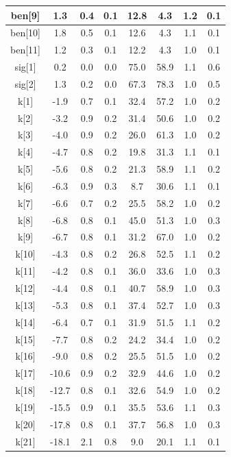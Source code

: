 \begin{longtable}{|c|c|c|c|c|c|c|c|}
\hline
ben[9] & 1.3 & 0.4 & 0.1 & 12.8 & 4.3 & 1.2 & 0.1 \\
\hline
ben[10] & 1.8 & 0.5 & 0.1 & 12.6 & 4.3 & 1.1 & 0.1 \\
\hline
ben[11] & 1.2 & 0.3 & 0.1 & 12.2 & 4.3 & 1.0 & 0.1 \\
\hline
sig[1] & 0.2 & 0.0 & 0.0 & 75.0 & 58.9 & 1.1 & 0.6 \\
\hline
sig[2] & 1.3 & 0.2 & 0.0 & 67.3 & 78.3 & 1.0 & 0.5 \\
\hline
k[1] & -1.9 & 0.7 & 0.1 & 32.4 & 57.2 & 1.0 & 0.2 \\
\hline
k[2] & -3.2 & 0.9 & 0.2 & 31.4 & 50.6 & 1.0 & 0.2 \\
\hline
k[3] & -4.0 & 0.9 & 0.2 & 26.0 & 61.3 & 1.0 & 0.2 \\
\hline
k[4] & -4.7 & 0.8 & 0.2 & 19.8 & 31.3 & 1.1 & 0.1 \\
\hline
k[5] & -5.6 & 0.8 & 0.2 & 21.3 & 58.9 & 1.1 & 0.2 \\
\hline
k[6] & -6.3 & 0.9 & 0.3 & 8.7 & 30.6 & 1.1 & 0.1 \\
\hline
k[7] & -6.6 & 0.7 & 0.2 & 25.5 & 58.2 & 1.0 & 0.2 \\
\hline
k[8] & -6.8 & 0.8 & 0.1 & 45.0 & 51.3 & 1.0 & 0.3 \\
\hline
k[9] & -6.7 & 0.8 & 0.1 & 31.2 & 67.0 & 1.0 & 0.2 \\
\hline
k[10] & -4.3 & 0.8 & 0.2 & 26.8 & 52.5 & 1.1 & 0.2 \\
\hline
k[11] & -4.2 & 0.8 & 0.1 & 36.0 & 33.6 & 1.0 & 0.3 \\
\hline
k[12] & -4.4 & 0.8 & 0.1 & 40.7 & 58.9 & 1.0 & 0.3 \\
\hline
k[13] & -5.3 & 0.8 & 0.1 & 37.4 & 52.7 & 1.0 & 0.3 \\
\hline
k[14] & -6.4 & 0.7 & 0.1 & 31.9 & 51.5 & 1.1 & 0.2 \\
\hline
k[15] & -7.7 & 0.8 & 0.2 & 24.2 & 34.4 & 1.0 & 0.2 \\
\hline
k[16] & -9.0 & 0.8 & 0.2 & 25.5 & 51.5 & 1.0 & 0.2 \\
\hline
k[17] & -10.6 & 0.9 & 0.2 & 32.9 & 44.6 & 1.0 & 0.2 \\
\hline
k[18] & -12.7 & 0.8 & 0.1 & 32.6 & 54.9 & 1.0 & 0.2 \\
\hline
k[19] & -15.5 & 0.9 & 0.1 & 35.5 & 53.6 & 1.1 & 0.3 \\
\hline
k[20] & -17.8 & 0.8 & 0.1 & 37.7 & 56.8 & 1.0 & 0.3 \\
\hline
k[21] & -18.1 & 2.1 & 0.8 & 9.0 & 20.1 & 1.1 & 0.1 \\

\end{longtable}
